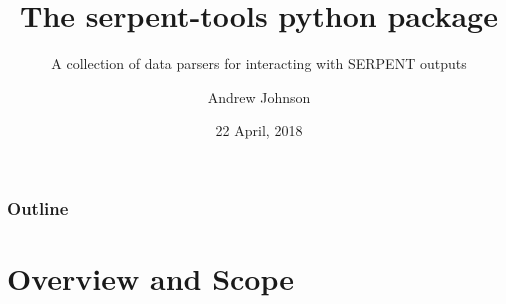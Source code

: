 %
%
%


\title{The serpent-tools python package}
\subtitle{A collection of data parsers for interacting with SERPENT outputs}
\author{Andrew Johnson}
\date{22 April, 2018}

\newcommand{\sss}{\texttt{SERPENT }}
\newcommand{\colShare}{0.48\textwidth}

\newcommand{\backupbegin}{
       \newcounter{framenumberappendix}
          \setcounter{framenumberappendix}{\value{framenumber}}
      }
\newcommand{\backupend}{
     \addtocounter{framenumberappendix}{-\value{framenumber}}
        \addtocounter{framenumber}{\value{framenumberappendix}} 
    }  

\hypersetup{colorlinks,linkcolor=,urlcolor=links}
\newcommand{\toapi}[3]{\href{https://serpent-tools.readthedocs.io/en/latest/api/#1.html\##2.#3}{\texttt{#3}}}
\newcommand{\github}[1]{\url{https://github.com/CORE-GATECH-GROUP/serpent-tools/#1}}


\begin{frame}
\titlepage
\end{frame}

\begin{frame}
\frametitle{Outline}
\tableofcontents
\end{frame}

\section{Overview and Scope}

